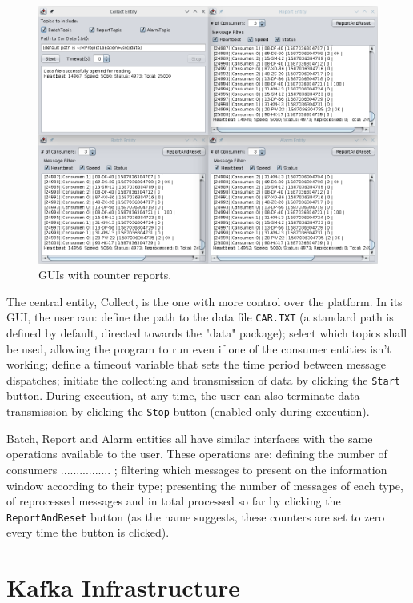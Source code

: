 \documentclass[12pt]{article}
\begin{document}
\begin{figure}[H]
  \centering
  \begin{minipage}{\textwidth}
    \centering
    \includegraphics[width=.75\linewidth]{img/GUI_3.png}
  \end{minipage}%
  \caption{GUIs with counter reports.}
  \label{GUI_3}
\end{figure} 

The central entity, Collect, is the one with more control over the platform.
In its GUI, the user can: 
define the path to the data file \texttt{CAR.TXT} (a standard path is defined by default, directed towards the "data" package);
select which topics shall be used, allowing the program to run even if one of the consumer entities isn't working;
define a timeout variable that sets the time period between message dispatches;
initiate the collecting and transmission of data by clicking the \texttt{Start} button.
During execution, at any time, the user can also terminate data transmission by clicking the \texttt{Stop} button (enabled only during execution).

Batch, Report and Alarm entities all have similar interfaces with the same operations available to the user.
These operations are:
defining the number of consumers ................ ; %
filtering which messages to present on the information window according to their type;
presenting the number of messages of each type, of reprocessed messages and in total processed so far by clicking the \texttt{ReportAndReset} button 
(as the name suggests, these counters are set to zero every time the button is clicked).

\newpage
\section{Kafka Infrastructure} \label{infrastructure} %
\end{document}
